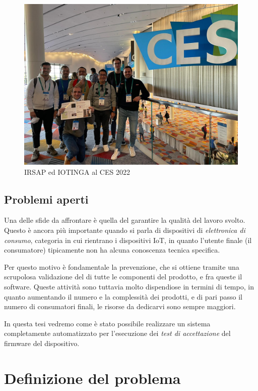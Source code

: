 \documentclass[12pt,a4paper,twoside,titlepage]{book}
\begin{document}
\begin{figure}[ht]
    \centering
    \includegraphics[width=12cm]{img/ces.jpeg}
    \caption{IRSAP ed IOTINGA al CES 2022}
    \label{fig:ces}
\end{figure}

\section{Problemi aperti}

Una delle sfide da affrontare è quella del garantire la qualità del lavoro svolto. Questo 
è ancora più importante quando si parla di dispositivi di \textit{elettronica di consumo}, 
categoria in cui rientrano i dispositivi IoT, in quanto l'utente finale (il \Gls{consumatore})
tipicamente non ha alcuna conoscenza tecnica specifica. 

Per questo motivo è fondamentale la prevenzione, che si ottiene tramite una scrupolosa validazione 
del di tutte le componenti del prodotto, e fra queste il software. Queste attività sono tuttavia 
molto dispendiose in termini di tempo, in quanto aumentando il numero e la complessità dei prodotti,
e di pari passo il numero di consumatori finali, le risorse da dedicarvi sono sempre maggiori. 

In questa tesi vedremo come è stato possibile realizzare un sistema completamente automatizzato 
per l'esecuzione dei \textit{test di accettazione} del \Gls{firmware} del dispositivo. 

\chapter{Definizione del problema}
\end{document}
